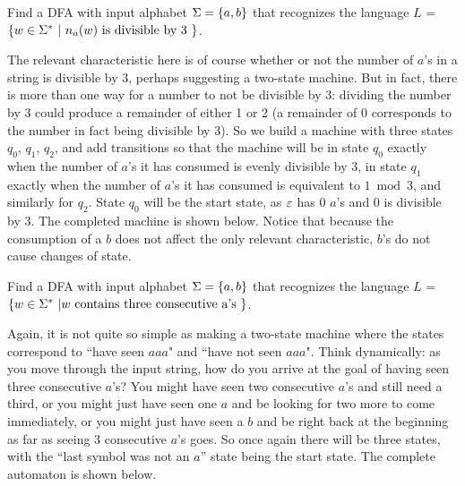 \begin{example}
Find a DFA with input alphabet $\Sigma = \mbox{$\{a,b\}$}$ that recognizes the language
$L$ = $\{w \in \Sigma^* \ | \  n_a(w)  \mbox{ is divisible by 3 } \}$.

The relevant characteristic here is of course whether or not the number of $a$'s
in a string is divisible by 3, perhaps suggesting a two-state machine.  But in
fact, there is more than one way for a number to not be divisible by 3: dividing
the number by 3 could produce a remainder of either 1 or 2 (a remainder of 0
corresponds to the number in fact being divisible by 3).  So we build a machine
with three states $q_0$, $q_1$, $q_2$, and add transitions so that the machine
will be in state $q_0$ exactly when the number of $a$'s it has consumed is evenly
divisible by 3, in state $q_1$ exactly when the number of $a$'s it has consumed
is equivalent to $ 1 \bmod{3}$, and similarly for $q_2$.  State $q_0$ will be the
start state, as $\varepsilon$ has 0 $a$'s and 0 is divisible by 3.  The completed
machine is shown below.  Notice that because the consumption of a $b$ does not
affect the only relevant characteristic, $b$'s do not cause changes of 
state.


\end{example}


\begin{example}
Find a DFA with input alphabet $\Sigma = \mbox{$\{a,b\}$}$ that recognizes the language
$L$ = $\{w \in \Sigma^* \ | w \mbox{ contains three consecutive a's } \}$.

Again, it is not quite so simple as making a two-state machine where the states
correspond to ``have seen $aaa$" and ``have not seen $aaa$".
Think dynamically: as you move through the
input string, how do you arrive at the goal of having seen three consecutive
$a$'s?  You might have seen two consecutive $a$'s and still need a third, or
you might just have seen one $a$ and be looking for two more to come
immediately, or you might just have seen a $b$ and be right back at the
beginning as far as seeing 3 consecutive $a$'s goes.  So once again there will be
three states, with the ``last symbol was not an $a$'' state being the start
state.  The complete automaton is shown below.

\medskip
{}
\end{example}

